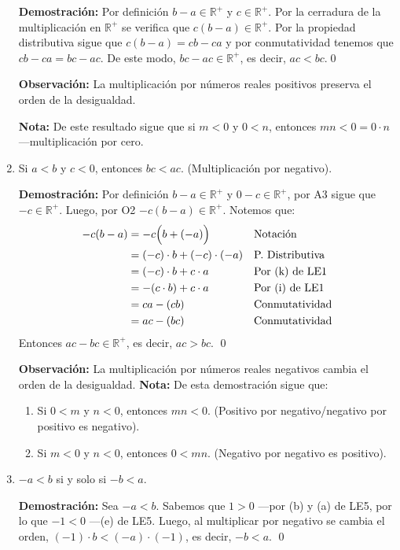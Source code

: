 \documentclass[11pt]{article}
\newcommand{\R}{\mathbb{R}}
\begin{document}
\begin{enumerate}[label=\alph*)]
    \textbf{Demostración:} Por definición $b-a \in \R^+$ y $c \in \R^+$. Por la cerradura de la multiplicación en $\R^+$ se verifica que $c(b-a) \in \R^+$. Por la propiedad distributiva sigue que $c(b-a)=cb-ca$ y por conmutatividad tenemos que $cb-ca=bc-ac$. De este modo, $bc-ac \in \R^+$, es decir, $ac<bc$.\qed

    \textbf{Observación:} La multiplicación por números reales positivos preserva el orden de la desigualdad.

    \textbf{Nota:} De este resultado sigue que si $m<0$ y $0<n$, entonces $mn<0=0\cdot n$ —multiplicación por cero.

    \item Si $a<b$ y $c<0$, entonces $bc<ac$. (Multiplicación por negativo).
    
    \textbf{Demostración:} Por definición $b-a \in \R^+$ y $0 - c \in \R^+$, por A3 sigue que $ -c \in \R^+$. Luego, por O2 $-c(b-a) \in \R^+$. Notemos que:
    \begin{align*}
    -c(b-a) &= -c \Bigl( b + (-a) \Bigr) && \text{Notación}\\
    &= (-c) \cdot b + (-c) \cdot (-a) && \text{P. Distributiva}\\
    &= (-c) \cdot b + c \cdot a && \text{Por (k) de LE1}\\
    &= -(c \cdot b) + c \cdot a && \text{Por (i) de LE1}\\
    &= ca -(cb) && \text{Conmutatividad}\\
    &= ac - (bc) && \text{Conmutatividad}
    \end{align*}
    Entonces $ac - bc \in \R^+$, es decir, $ac>bc$. \qed

    \textbf{Observación:} La multiplicación por números reales negativos cambia el orden de la desigualdad.
    \textbf{Nota:} De esta demostración sigue que: \begin{enumerate}[label=\roman*)]
        \item Si $0<m$ y $n<0$, entonces $mn<0$. (Positivo por negativo/negativo por positivo es negativo).
        \item Si $m<0$ y $n<0$, entonces $0<mn$. (Negativo por negativo es positivo).
    \end{enumerate}

    \item $-a<b$ si y solo si $-b<a$.
    
    \textbf{Demostración:} Sea $-a<b$. Sabemos que $1>0$ —por (b) y (a) de LE5, por lo que $-1<0$ —(e) de LE5. Luego, al multiplicar por negativo se cambia el orden, $(-1)\cdot b < (-a) \cdot (-1)$, es decir, $-b<a$. \qed
    

\end{enumerate}
\end{document}
